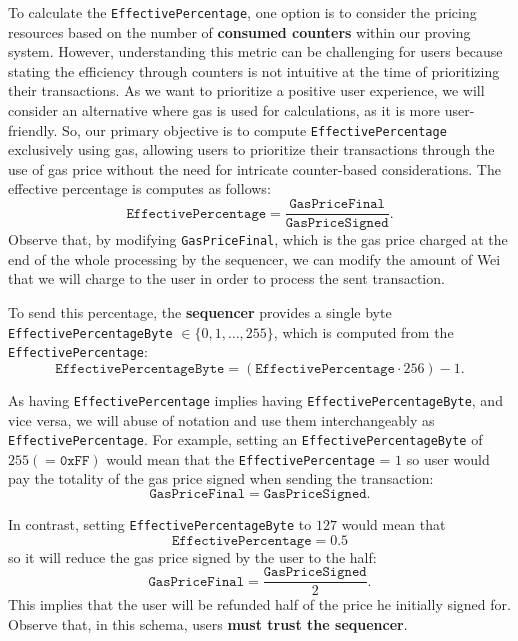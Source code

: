 To calculate the \texttt{EffectivePercentage}, one option is to consider the pricing resources based on the number of \textbf{consumed counters} within our proving system. However, understanding this metric can be challenging for users because stating the efficiency through counters is not intuitive at the time of prioritizing their transactions. As we want to prioritize a positive user experience, we will consider an alternative where gas is used for calculations, as it is more user-friendly. So, our primary objective is to compute \texttt{EffectivePercentage} exclusively using gas, allowing users to prioritize their transactions through the use of gas price without the need for intricate counter-based considerations. The effective percentage is computes as follows:
\[
\texttt{EffectivePercentage} = \frac{\texttt{GasPriceFinal}}{\texttt{GasPriceSigned}}.
\]
Observe that, by modifying \texttt{GasPriceFinal}, which is the gas price charged at the end of the whole processing by the sequencer, we can modify the amount of Wei that we will charge to the user in order to process the sent transaction.

To send this percentage, the \textbf{sequencer} provides a single byte \texttt{EffectivePercentageByte} $\in \{0, 1, \dots, 255 \}$, which is computed from the \texttt{EffectivePercentage}:
\[
\texttt{EffectivePercentageByte} = (\texttt{EffectivePercentage}\cdot 256) - 1.
\]

As having \texttt{EffectivePercentage} implies having \texttt{EffectivePercentageByte}, and vice versa, we will abuse of notation and use them interchangeably as \texttt{EffectivePercentage}. For example, setting an \texttt{EffectivePercentageByte} of $255 (= \texttt{0xFF})$ would mean that the \texttt{EffectivePercentage} = $1$ so user would pay the totality of the gas price signed when sending the transaction:
\[
\texttt{GasPriceFinal} = \texttt{GasPriceSigned}.
\]

In contrast, setting \texttt{EffectivePercentageByte} to $127$ would mean that
\[
\texttt{EffectivePercentage} = 0.5
\]
so it will reduce the gas price signed by the user to the half:
\[
\texttt{GasPriceFinal} = \frac{\texttt{GasPriceSigned}}{2}.
\]
This implies that the user will be refunded half of the price he initially signed for. Observe that, in this schema, users \textbf{must trust the sequencer}.





